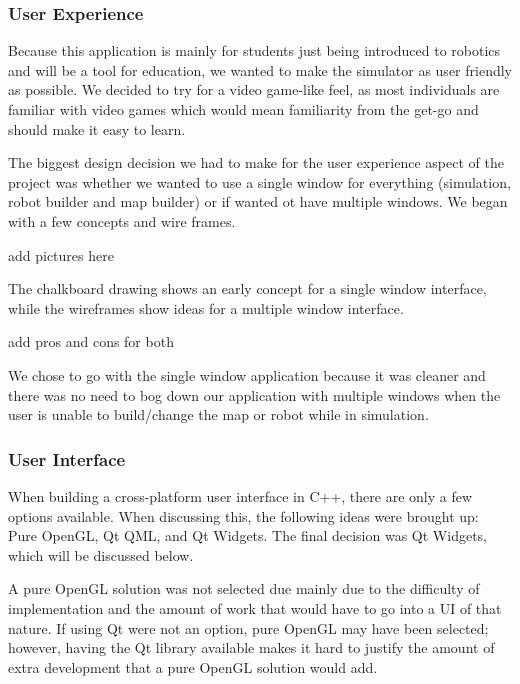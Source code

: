  \subsubsection*{User Experience}
	Because this application is mainly for students just being introduced to robotics and will be a tool for education, we wanted to make the simulator as user friendly as possible. We decided to try for a video game-like feel, as most individuals are familiar with video games which would mean familiarity from the get-go and should make it easy to learn. 
	
	The biggest design decision we had to make for the user experience aspect of the project was whether we wanted to use a single window for everything (simulation, robot builder and map builder) or if wanted ot have multiple windows. We began with a few concepts and wire frames. 
	
add pictures here
	
	The chalkboard drawing shows an early concept for a single window interface, while the wireframes show ideas for a multiple window interface. 
	
add pros and cons for both
	

We chose to go with the single window application because it was cleaner and there was no need to bog down our application with multiple windows when the user is unable to build/change the map or robot while in simulation.  
 
 
 \subsubsection*{User Interface}
 	When building a cross-platform user interface in C++, there are only a few options available. When discussing this, the following ideas were brought up: Pure OpenGL, Qt QML, and Qt Widgets. The final decision was Qt Widgets, which will be discussed below.
 	
 	A pure OpenGL solution was not selected due mainly due to the difficulty of implementation and the amount of work that would have to go into a UI of that nature. If using Qt were not an option, pure OpenGL may have been selected; however, having the Qt library available makes it hard to justify the amount of extra development that a pure OpenGL solution would add.
 	
